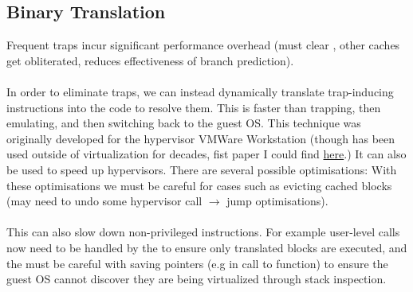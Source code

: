 \documentclass{report}
\begin{document}
        \subsection*{Binary Translation}
            Frequent traps incur significant performance overhead (must clear , other caches get obliterated, reduces effectiveness of branch prediction).
            \\
            \\ In order to eliminate traps, we can instead dynamically translate trap-inducing instructions into the code to resolve them. This is faster than trapping, then emulating, and then switching back to the guest OS.
            This technique was originally developed for the  hypervisor VMWare Workstation (though has been used outside of virtualization for decades, fist paper I could find \href{https://dl.acm.org/doi/10.1145/151220.151227}{here}.) It can also be used to speed up  hypervisors.
            There are several possible optimisations:
            With these optimisations we must be careful for cases such as evicting cached blocks (may need to undo some hypervisor call $\to$ jump optimisations).
            \\
            \\ This can also slow down non-privileged instructions. For example user-level calls now need to be handled by the  to ensure only translated blocks are executed, and the  must be careful with saving pointers (e.g in call to  function) to ensure the guest OS cannot discover they are being virtualized through stack inspection.
\end{document}
